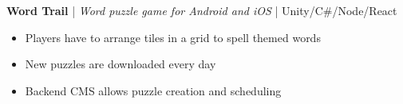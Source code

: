 \item \textbf{Word Trail} | \textit{Word puzzle game for Android and iOS} | Unity/C\#/Node/React
\begin{itemize}
    \item Players have to arrange tiles in a grid to spell themed words
    \item New puzzles are downloaded every day
    \item Backend CMS allows puzzle creation and scheduling
\end{itemize}
